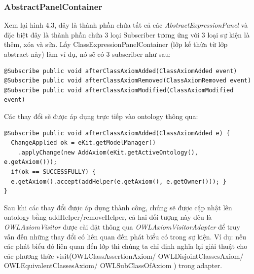 \subsubsection{AbstractPanelContainer}
Xem lại hình 4.3, đây là thành phần chứa tất cả các \textit{AbstractExpressionPanel} và đặc biệt đây là thành phần chứa 3 loại Subscriber tương ứng với 3 loại sự kiện là thêm, xóa và sửa. Lấy ClassExpressionPanelContainer (lớp kế thừa từ lớp abstract này) làm ví dụ, nó sẽ có 3 subscriber như sau:
\begin{verbatim}
@Subscribe public void afterClassAxiomAdded(ClassAxiomAdded event) 
@Subscribe public void afterClassAxiomRemoved(ClassAxiomRemoved event) 
@Subscribe public void afterClassAxiomModified(ClassAxiomModified event)
\end{verbatim}
Các thay đổi sẽ được áp dụng trực tiếp vào ontology thông qua:
\begin{verbatim}
@Subscribe public void afterClassAxiomAdded(ClassAxiomAdded e) {
  ChangeApplied ok = eKit.getModelManager()
	.applyChange(new AddAxiom(eKit.getActiveOntology(), e.getAxiom()));
  if(ok == SUCCESSFULLY) {
  e.getAxiom().accept(addHelper(e.getAxiom(), e.getOwner())); }
} 
\end{verbatim}
Sau khi các thay đổi được áp dụng thành công, chúng sẽ được cập nhật lên ontology bằng addHelper/removeHelper, cả hai đối tượng này đêu là \textit{OWLAxiomVisitor} được cài đặt thông qua \textit{OWLAxiomVisitorAdapter} để truy vấn đến những thay đổi có liên quan đến phát biểu có trong sự kiện. Ví dụ: nếu các phát biểu đó liên quan đến lớp thì chúng ta chỉ định nghĩa lại giải thuật cho các phương thức visit(OWLClassAssertionAxiom/ OWLDisjointClassesAxiom/ OWLEquivalentClassesAxiom/ OWLSubClassOfAxiom ) trong adapter.
